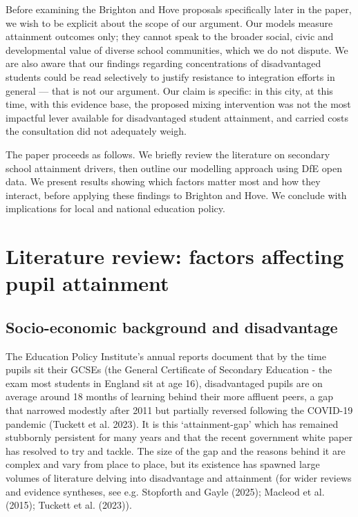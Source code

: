 \documentclass[
  12pt,
  titlepage]{article}
\begin{document}
Before examining the Brighton and Hove proposals specifically later in
the paper, we wish to be explicit about the scope of our argument. Our
models measure attainment outcomes only; they cannot speak to the
broader social, civic and developmental value of diverse school
communities, which we do not dispute. We are also aware that our
findings regarding concentrations of disadvantaged students could be
read selectively to justify resistance to integration efforts in general
--- that is not our argument. Our claim is specific: in this city, at
this time, with this evidence base, the proposed mixing intervention was
not the most impactful lever available for disadvantaged student
attainment, and carried costs the consultation did not adequately weigh.

The paper proceeds as follows. We briefly review the literature on
secondary school attainment drivers, then outline our modelling approach
using DfE open data. We present results showing which factors matter
most and how they interact, before applying these findings to Brighton
and Hove. We conclude with implications for local and national education
policy.

\section{Literature review: factors affecting pupil
attainment}\label{literature-review-factors-affecting-pupil-attainment}

\subsection{Socio-economic background and
disadvantage}\label{socio-economic-background-and-disadvantage}

The Education Policy Institute's annual reports document that by the
time pupils sit their GCSEs (the General Certificate of Secondary
Education - the exam most students in England sit at age 16),
disadvantaged pupils are on average around 18 months of learning behind
their more affluent peers, a gap that narrowed modestly after 2011 but
partially reversed following the COVID-19 pandemic (Tuckett et al.
2023). It is this `attainment-gap' which has remained stubbornly
persistent for many years and that the recent government white paper has
resolved to try and tackle. The size of the gap and the reasons behind
it are complex and vary from place to place, but its existence has
spawned large volumes of literature delving into disadvantage and
attainment (for wider reviews and evidence syntheses, see e.g. Stopforth
and Gayle (2025); Macleod et al. (2015); Tuckett et al. (2023)).
\end{document}

